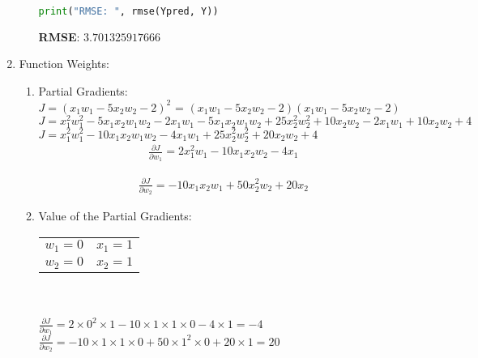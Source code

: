 \documentclass[12pt]{article}
\begin{document}
\begin{enumerate}
\begin{enumerate}
\begin{lstlisting}[language=Python]
			print("RMSE: ", rmse(Ypred, Y))
		\end{lstlisting}
	
	\textbf{RMSE}: $3.701325917666$

		
	
	\end{enumerate}
	
	\begin{comment}
	\newpage
		\end{comment}


	\item Function Weights:\\
	
	\begin{enumerate}
	
	\item Partial Gradients:\\
	
	$J=(x_1 w_1 -5x_2 w_2-2)^2$ = $(x_1 w_1 -5x_2 w_2-2)$$(x_1 w_1 -5x_2 w_2-2)$\\
	$J=x_1^{2}w_1^{2} - 5x_{1}x_{2}w_{1}w_{2}-2x_{1}w_{1}-5x_{1}x_{2}w_{1}w_{2} + 25x_2^{2}w_2^{2} + 10x_{2}w_2-2x_{1}w_{1} +10x_{2}w_{2} + 4$\\
	$J=x_1^{2}w_1^{2} - 10x_{1}x_{2}w_{1}w_{2} -4x_{1}w_{1} + 25x_2^{2}w_2^{2} + 20x_{2}w_{2} + 4$\\
	
	
	\begin{equation}
		\begin{split}
			\frac{\partial J}{\partial w_1} = 2x_1^{2}w_1 - 10x_{1}x_{2}w_{2} - 4x_{1}
		\end{split}
	\end{equation}

	\begin{equation}
		\begin{split}
			\frac{\partial J}{\partial w_2} = -10x_{1}x_{2}w_{1} + 50x_2^{2}w_2 + 20x_2
		\end{split}
	\end{equation}
	
	\item Value of the Partial Gradients:\\
	
	\begin{tabular}{ c c}
		$w_1 = 0$ & $x_1 = 1$\\ 
		$w_2 = 0$ & $x_2 = 1$ 
	\end{tabular}\\
\\
	
	$\frac{\partial J}{\partial w_1} = 2 \times 0^2 \times 1 - 10 \times 1 \times 1 \times 0 - 4 \times 1 = -4$\\
	$\frac{\partial J}{\partial w_2} = - 10 \times 1 \times 1 \times 0 + 50 \times 1^2 \times 0 + 20 \times 1 = 20$\\
	


\end{enumerate}
\end{enumerate}
\end{document}
